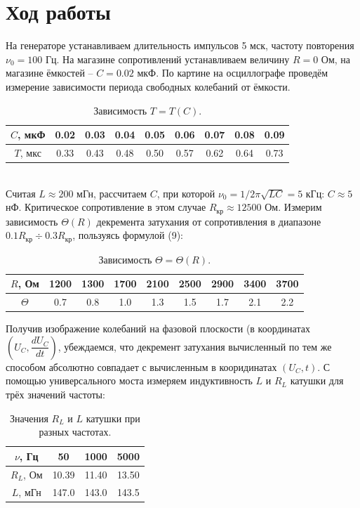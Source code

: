 \documentclass[a4paper,12pt]{article}
\begin{document}
\section*{Ход работы}
На генераторе устанавливаем длительность импульсов 5 мск, частоту повторения $\nu_0 = 100$ Гц. На магазине сопротивлений устанавливаем величину $R = 0$ Ом, на магазине ёмкостей -- $C = 0.02$ мкФ. По картине на осциллографе проведём измерение зависимости периода свободных колебаний от ёмкости.
\begin{table}[h]
\centering
\begin{tabular}{|c|c|c|c|c|c|c|c|c|}
\hline
$C$, мкФ    & 0.02 & 0.03 & 0.04 & 0.05 & 0.06 & 0.07 & 0.08 & 0.09 \\ \hline
$T$, мкс    & 0.33 & 0.43 & 0.48 & 0.50 & 0.57 & 0.62 & 0.64 & 0.73  \\ \hline
\end{tabular}
\caption{Зависимость $T = T(C)$.}
\end{table}\\
Считая $L \approx 200$ мГн, рассчитаем $C$, при которой $\nu_0 = 1/2\pi \sqrt{LC} = 5$ кГц: $C \approx 5$ нФ. Критическое сопротивление в этом случае $R_{\text{кр}} \approx 12500$ Ом. Измерим зависимость $\Theta(R)$ декремента затухания от сопротивления в диапазоне $0.1R_{\text{кр}}\div 0.3R_{\text{кр}}$, пользуясь формулой (9):
\begin{table}[h]
\centering
\begin{tabular}{|c|c|c|c|c|c|c|c|c|}
\hline
$R$, Ом     & 1200 & 1300 & 1700 & 2100 & 2500 & 2900 & 3400 & 3700 \\ \hline
$\Theta$ & 0.7  & 0.8  & 1.0  & 1.3  & 1.5  & 1.7  & 2.1  & 2.2  \\ \hline
\end{tabular}
\caption{Зависимость $\Theta = \Theta(R)$.}
\end{table}
\newpage
Получив изображение колебаний на фазовой плоскости (в координатах $\left(U_C, \dfrac{dU_C}{dt}\right)$, убеждаемся, что декремент затухания вычисленный по тем же способом абсолютно совпадает с вычисленным в кооридинатах $\left( U_C, t\right)$.
С помощью универсального моста измеряем индуктивность $L$ и $R_L$ катушки для трёх значений частоты:
\begin{table}[h]
\centering
\begin{tabular}{|c|c|c|c|}
\hline
$\nu$, Гц  & 50    & 1000  & 5000  \\ \hline
$R_L$, Ом & 10.39 & 11.40 & 13.50 \\ \hline
$L$, мГн & 147.0 & 143.0 & 143.5 \\ \hline
\end{tabular}
\caption{Значения $R_L$ и $L$ катушки при разных частотах.}
\end{table}
\end{document}
